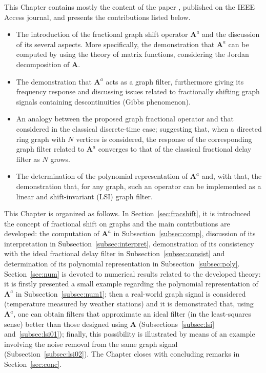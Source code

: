 This Chapter contains mostly the content of the paper \cite{ribeiro2022fractional}, published on the IEEE Access journal, and presents the contributions listed below.
\begin{itemize}[noitemsep]
\item The introduction of the fractional graph shift operator $\mathbf{A}^a$ and the discussion of its several aspects. More specifically, the demonstration that $\mathbf{A}^a$ can be computed by using the theory of matrix functions, considering the Jordan decomposition of $\mathbf{A}$.

\item The demonstration that $\mathbf{A}^a$ acts as a graph filter, furthermore giving its frequency response and discussing issues related to fractionally shifting graph signals containing descontinuities (Gibbs phenomenon).

\item An analogy between the proposed graph fractional operator and that considered in the classical discrete-time case; suggesting that, when a directed ring graph with $N$ vertices is considered, the response of the corresponding graph filter related to $\mathbf{A}^a$ converges to that of the classical fractional delay filter as $N$ grows.

\item The determination of the polynomial representation of $\mathbf{A}^a$ and, with that, the demonstration that, for any graph, such an operator can be implemented as a linear and shift-invariant (LSI) graph filter.
\end{itemize}

This Chapter is organized as follows. In Section~\ref{sec:fracshift}, it is introduced the concept of fractional shift on graphs and the main contributions are developed: the computation of $\mathbf{A}^a$ in Subsection~\ref{subsec:comp}, discussion of its interpretation in Subsection~\ref{subsec:interpret}, demonstration of its consistency with the ideal fractional delay filter in Subsection~\ref{subsec:consist} and determination of its polynomial representation in Subsection~\ref{subsec:poly}. Section~\ref{sec:num} is devoted to numerical results related to the developed theory: it is firstly presented a small example regarding the polynomial representation of $\mathbf{A}^a$ in Subsection~\ref{subsec:num1}; then a real-world graph signal is considered (temperature measured by weather stations) and it is demonstrated that, using $\mathbf{A}^a$, one can obtain filters that approximate an ideal filter (in the least-squares sense) better than those designed using $\mathbf{A}$ (Subsections~\ref{subsec:lsi} and~\ref{subsec:lsi01}); finally, this possibility is illustrated by means of an example involving the noise removal from the same graph signal (Subsection~\ref{subsec:lsi02}). The Chapter closes with concluding remarks in Section~\ref{sec:conc}.


